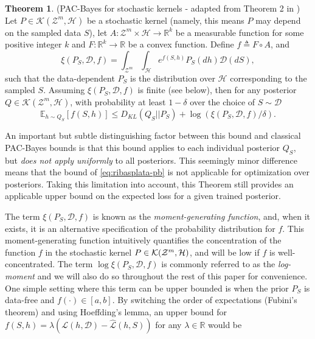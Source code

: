 \documentclass[letterpaper]{article} %
\theoremstyle{definition}
\newtheorem{theorem}{Theorem}[section]
\newcommand{\Expect}[2]{\mathbb{E}_{#1}\left [#2 \right ]}
\begin{document}
\begin{theorem} (PAC-Bayes for stochastic kernels - adapted from Theorem 2 in \citet{Rivasplata2020}) \label{thm:rivasplata-pb}
	Let $P\in \mathcal{K}(\mathcal{Z}^m, \mathcal{H})$ be a stochastic kernel (namely, this means $P$ may depend on the sampled data $S$), let $A: \mathcal{Z}^m\times \mathcal{H}\rightarrow \mathbb{R}^k$ be a measurable function for some positive integer $k$ and $F:\mathbb{R}^k\rightarrow \mathbb{R}$ be a convex function.
	Define $f\triangleq F\circ A$, and
	$$
	\xi(P_S, \mathcal{D}, f)=\int_{\mathcal{Z}^m}\int_{\mathcal{H}}e^{f(S, h)}P_S(dh)\mathcal{D}(dS),
	$$
	such that the data-dependent $P_S$ is the distribution over $\mathcal{H}$ corresponding to the sampled $S$. Assuming $\xi(P_S, \mathcal{D}, f)$ is finite (see below), then for any posterior $Q\in \mathcal{K}(\mathcal{Z}^m, \mathcal{H})$, with probability at least $1-\delta$ over the choice of $S\sim \mathcal{D}$
	\begin{equation} \label{eq:ribasplata-pb}
	\Expect{h\sim Q_S}{f(S, h)} \leq D_{KL}(Q_S||P_S)+\log\left (\xi(P_S, \mathcal{D}, f)/\delta\right ) .
	\end{equation}
\end{theorem}

An important but subtle distinguishing factor between this bound and classical PAC-Bayes bounds is that this bound applies to each individual posterior $Q_S$, but \emph{does not apply uniformly} to all posteriors. This seemingly minor difference means that the bound of \eqref{eq:ribasplata-pb} is not applicable for optimization over posteriors. Taking this limitation into account, this Theorem still provides an applicable upper bound on the expected loss for a given trained posterior. 

The term $\xi(P_S, \mathcal{D}, f)$ is known as the \emph{moment-generating function}, and, when it exists, it is an alternative specification of the probability distribution for $f$.
This moment-generating function intuitively quantifies the concentration of the function $f$ in the stochastic kernel $P\in{\cal K}({\cal Z}^m,{\cal H})$, and will be low if $f$ is well-concentrated.
The term $\log\xi(P_S, \mathcal{D}, f)$ is commonly referred to as the \emph{log-moment} and we will also do so throughout the rest of this paper for convenience. 
One simple setting where this term can be upper bounded is when the prior $P_S$ is data-free and $f(\cdot)\in[a,b]$. By switching the order of expectations (Fubini's theorem) and using Hoeffding's lemma, an upper bound for $f(S,h)=\lambda(\mathcal{L}(h,\mathcal{D})-\hat{\mathcal{L}}(h, S))$ for any $\lambda\in \mathbb{R}$ would be
\end{document}
